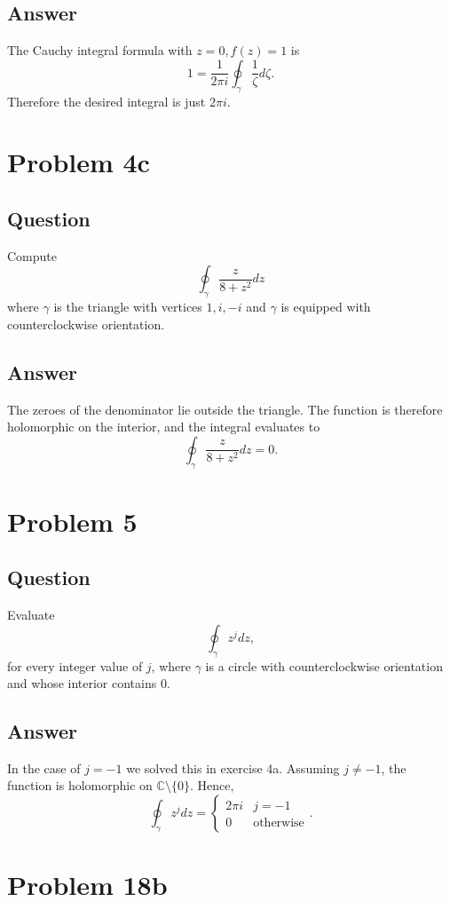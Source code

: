\documentclass[11pt]{article}
\begin{document}
\subsection{Answer}
The Cauchy integral formula with $z =0, f(z) = 1$ is
\[1 = \frac{1}{2 \pi i } \oint_\gamma \frac{1}{\zeta} d \zeta.\]
Therefore the desired integral is just $2 \pi i$.

\section{Problem  4c}
\subsection{Question}
Compute
\[\oint_\gamma \frac{z}{8+z^2} dz\]
where $\gamma$ is the triangle with vertices $1,i,-i$ and $\gamma$ is equipped with counterclockwise orientation.
\subsection{Answer}
The zeroes of the denominator lie outside the triangle. The function is therefore holomorphic on the interior, and the integral evaluates to
\[\oint_\gamma \frac{z}{8+z^2} dz = 0.\]


\section{Problem  5}
\subsection{Question}
Evaluate 
\[\oint_\gamma z^j dz,\]
for every integer value of $j$, where $\gamma$ is a circle with counterclockwise orientation and whose interior contains 0.
\subsection{Answer}
In the case of $j=-1$ we solved this in exercise 4a. Assuming $j \neq -1$, the function is holomorphic on $\mathbb{C} \setminus \{0\}$. Hence,
\[\oint_\gamma z^j dz = \left\{ \begin{array}{ll} 2 \pi i & j=-1\\ 0 &\mbox{otherwise} \end{array}\right..\]


\section{Problem  18b}
\end{document}
